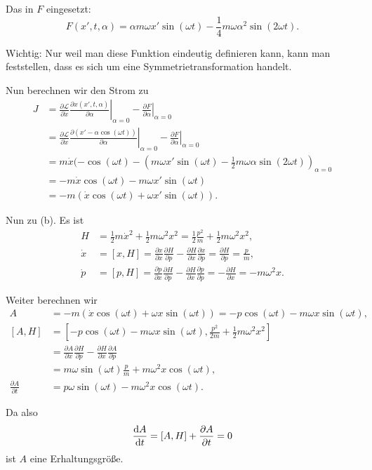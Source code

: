 Das in $F$ eingesetzt:
\[
	F(x', t, \alpha) = \alpha m \omega x' \sin(\omega t) - \frac{1}{4} m \omega \alpha^2 \sin(2 \omega t)
	\text{.}
\]

Wichtig: Nur weil man diese Funktion eindeutig definieren kann, kann man feststellen, dass es sich um eine Symmetrietransformation handelt.

Nun berechnen wir den Strom zu
\begin{align*}
	J
	&= \frac{\partial \mathcal{L}}{\partial \dot{x}} \left. \frac{\partial x(x', t, \alpha)}{\partial \alpha} \right|_{\alpha = 0} - \left. \frac{\partial F}{\partial \alpha} \right|_{\alpha = 0} \\
	&= \frac{\partial \mathcal{L}}{\partial \dot{x}} \left. \frac{\partial (x' - \alpha \cos(\omega t))}{\partial \alpha} \right|_{\alpha = 0} - \left. \frac{\partial F}{\partial \alpha} \right|_{\alpha = 0} \\
	&= m \dot{x} (- \cos(\omega t) - \left( m \omega x' \sin(\omega t) - \frac{1}{2} m \omega \alpha \sin(2 \omega t) \right)_{\alpha = 0} \\
	&= - m \dot{x} \cos(\omega t) - m \omega x' \sin(\omega t) \\
	&= - m ( \dot{x} \cos(\omega t) + \omega x' \sin(\omega t) )	 \text{.}
\end{align*}

Nun zu (b). Es ist 
\begin{align*}
	H &= \frac{1}{2} m \dot{x}^2 + \frac{1}{2} m \omega^2 x^2 = \frac{1}{2} \frac{p^2}{m} + \frac{1}{2} m \omega^2 x^2 \text{,} \\
	\dot{x}	&= [x, H] = \frac{\partial x}{\partial x} \frac{\partial H}{\partial p} - \frac{\partial H}{\partial x} \frac{\partial x}{\partial p} = \frac{\partial H}{\partial p} = \frac{p}{m} \text{,} \\
	\dot{p} &= [p, H] = \frac{\partial p}{\partial x} \frac{\partial H}{\partial p} - \frac{\partial H}{\partial x} \frac{\partial p}{\partial p} = - \frac{\partial H}{\partial x} = - m \omega^2 x \text{.}
\end{align*}

Weiter berechnen wir
\begin{align*}
	A &= - m (\dot{x} \cos(\omega t) + \omega x \sin(\omega t)) = - p \cos(\omega t) - m \omega x \sin(\omega t) \text{,} \\
    [A, H] &= \left[ -p \cos(\omega t) - m \omega x \sin(\omega t), 	\frac{p^2}{2m} + \frac{1}{2} m \omega^2 x^2 \right] \\
	       &= \frac{\partial A}{\partial x} \frac{\partial H}{\partial p} - \frac{\partial H}{\partial x} \frac{\partial A}{\partial p} \\
	       &= m \omega \sin(\omega t) \frac{p}{m} + m \omega^2 x \cos(\omega t) \text{,} \\
	\frac{\partial A}{\partial t} &= p \omega \sin(\omega t) - m \omega^2 x \cos(\omega t) \text{.}
\end{align*}

Da also
\[
	\frac{\mathrm{d} A}{\mathrm{d} t} = [A, H] + \frac{\partial A}{\partial t} = 0
\]
ist $A$ eine Erhaltungsgröße.

